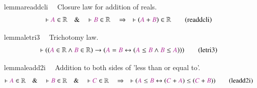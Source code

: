 \begin{restatable}{lemma}{readdcli}~~ Closure law for addition of reals. 
~
\begin{align}
\vdash \mc{A} \in \mathbb{R}\quad\&\quad \vdash \mc{B} \in
    \mathbb{R}\quad\Rightarrow\quad \vdash ( \mc{A} + \mc{B} ) \in
    \mathbb{R}\label{eq:readdcli}\tag{readdcli}
\end{align}
\end{restatable}

\begin{restatable}{lemma}{letri3}~~ Trichotomy law.  ~
\begin{align}
\vdash ( ( \mc{A} \in \mathbb{R} \wedge \mc{B} \in \mathbb{R} ) \rightarrow (
    \mc{A} = \mc{B} \leftrightarrow ( \mc{A} \le \mc{B} \wedge \mc{B} \le
    \mc{A} ) ) )\label{eq:letri3}\tag{letri3}
\end{align}
\end{restatable}

\begin{restatable}{lemma}{leadd2i}~~ Addition to both sides of 'less than or
equal to'.  ~
\begin{align}
\vdash \mc{A} \in \mathbb{R}\quad\&\quad \vdash \mc{B} \in
    \mathbb{R}\quad\&\quad \vdash \mc{C} \in \mathbb{R}\quad\Rightarrow\quad
    \vdash ( \mc{A} \le \mc{B} \leftrightarrow ( \mc{C} + \mc{A} ) \le ( \mc{C}
    + \mc{B} ) )\label{eq:leadd2i}\tag{leadd2i}
\end{align}
\end{restatable}

\dfnn

\dfno

\dfz

